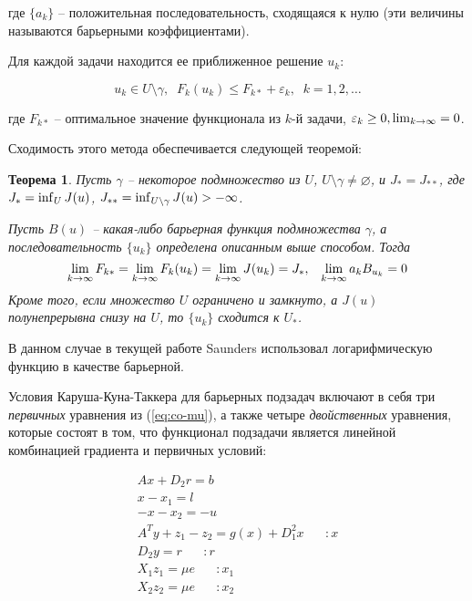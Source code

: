 \documentclass[a4paper, 12pt, titlepage]{article}
\theoremstyle{definition}
\theoremstyle{plain}
\newtheorem{SmartTheorem}{Теорема}
\theoremstyle{plain}
\begin{document}
где $\{a_{k}\}$ -- положительная последовательность, сходящаяся к нулю (эти 
величины называются барьерными коэффициентами).

Для каждой задачи находится ее приближенное решение $u_{k}$:

\begin{equation}
 u_{k} \in U \setminus \gamma, \;\; F_{k}(u_{k}) \leq F_{k*} + \varepsilon_{k},
 \;\; k = 1, 2, \ldots
\end{equation}

где $F_{k*}$ -- оптимальное значение функционала из $k$-й задачи,
$\varepsilon_{k} \geq 0, \operatornamewithlimits{lim}_{k \to \infty} = 0$.

Сходимость этого метода обеспечивается следующей теоремой:

\begin{SmartTheorem}
 Пусть $\gamma$ -- некоторое подмножество из $U$,
 $U \setminus \gamma \neq \varnothing$, и $J_{*} = J_{**}$, где
 $J_{*} = \operatornamewithlimits{inf}_{U} J(u)$,
 $J_{**} = \operatornamewithlimits{inf}_{U \setminus \gamma} J(u) > -\infty$.
 
 Пусть $B(u)$ -- какая-либо барьерная функция подмножества $\gamma$, а
 последовательность $\{u_{k}\}$ определена описанным выше способом. Тогда
 \begin{equation}
  \operatornamewithlimits{lim}_{k \to \infty} F_{k*} =
  \operatornamewithlimits{lim}_{k \to \infty} F_{k}(u_{k}) =
  \operatornamewithlimits{lim}_{k \to \infty} J(u_{k}) = J_{*}, \;\;\;
  \operatornamewithlimits{lim}_{k \to \infty} a_{k} B_{u_{k}} = 0
 \end{equation}
 Кроме того, если множество $U$ ограничено и замкнуто, а $J(u)$
 полунепрерывна снизу на $U$, то $\{u_{k}\}$ сходится к $U_{*}$.
\end{SmartTheorem}

В данном случае в текущей работе Saunders использовал логарифмическую функцию в
качестве барьерной.

Условия Каруша-Куна-Таккера для барьерных подзадач включают в себя три 
\textit{первичных} уравнения из (\ref{eq:co-mu}), а также четыре 
\textit{двойственных} уравнения, которые состоят в том, что функционал
подзадачи является линейной комбинацией градиента и первичных условий:

\begin{equation}
 \begin{aligned}
  A x + D_{2} r = b \\
  x - x_{1} = l \\
  -x - x_{2} = -u \\
  A^{T} y + z_{1} - z_{2} = g(x) + D_{1}^{2} x \;\;\;\;\;\; :x \\
  D_{2} y = r \;\;\;\;\;\; :r \\
  X_{1} z_{1} = \mu e \;\;\;\;\;\; :x_{1} \\
  X_{2} z_{2} = \mu e \;\;\;\;\;\; :x_{2} \\
 \end{aligned}
\end{equation}
\end{document}
